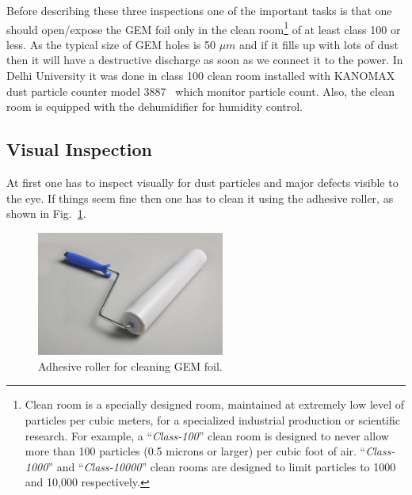 Before describing these three inspections one of the important tasks is that one should open/expose the GEM foil only in the clean room\footnote{Clean room is a specially designed room, maintained at extremely low level of particles per cubic meters, for a specialized industrial production or scientific research. For example, a ``\textit{Class-100}'' clean room is designed to never allow more than 100 particles (0.5 microns or larger) per cubic foot of air. ``\textit{Class-1000}'' and ``\textit{Class-10000}'' clean rooms are designed to limit particles to 1000 and 10,000 respectively.} of at least class 100 or less.
As the typical size of GEM holes is 50 $\mu m$ and if it fills up with lots of dust then it will have a destructive discharge as soon as we connect it to the power.
In Delhi University it was done in class 100 clean room installed with KANOMAX dust particle counter model 3887~\cite{KANOMAX-dust-particle-counter} which monitor particle count.
Also, the clean room is equipped with the dehumidifier for humidity control.


\subsection{Visual Inspection} %
\label{sub:visual_inspection}
At first one has to inspect visually for dust particles and major defects visible to the eye.
If things seem fine then one has to clean it using the adhesive roller, as shown in Fig.~\ref{fig:adhesive_roller}.
\begin{figure}[htbp]
    \centering
    \includegraphics[width=0.55\textwidth]{figures/GEM/Adhesive_roller.jpg}
    \caption{Adhesive roller for cleaning GEM foil.}
    \label{fig:adhesive_roller}
\end{figure}

